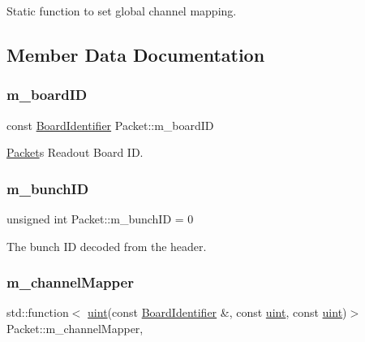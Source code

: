 Static function to set global channel mapping. 



\subsection{Member Data Documentation}
\mbox{\label{class_packet_a5e2c2ee20b510c10fc69d8045809a00e}} 
\subsubsection{\texorpdfstring{m\+\_\+board\+ID}{m\_boardID}}
{\footnotesize\ttfamily const \hyperlink{class_board_identifier}{Board\+Identifier} Packet\+::m\+\_\+board\+ID\hspace{0.3cm}{\ttfamily [private]}}



\hyperlink{class_packet}{Packet}\textquotesingle{}s Readout Board ID. 

\mbox{\label{class_packet_ad0a2dce379a45ee0f899d495f5e760fc}} 
\subsubsection{\texorpdfstring{m\+\_\+bunch\+ID}{m\_bunchID}}
{\footnotesize\ttfamily unsigned int Packet\+::m\+\_\+bunch\+ID = 0\hspace{0.3cm}{\ttfamily [private]}}



The bunch ID decoded from the header. 

\mbox{\label{class_packet_a33bf104c6d884aabd492de0e4eb5d293}} 
\subsubsection{\texorpdfstring{m\+\_\+channel\+Mapper}{m\_channelMapper}}
{\footnotesize\ttfamily std\+::function$<$ \hyperlink{_packet_8cpp_a69aa29b598b851b0640aa225a9e5d61d}{uint}(const \hyperlink{class_board_identifier}{Board\+Identifier} \&, const \hyperlink{_packet_8cpp_a69aa29b598b851b0640aa225a9e5d61d}{uint}, const \hyperlink{_packet_8cpp_a69aa29b598b851b0640aa225a9e5d61d}{uint})$>$ Packet\+::m\+\_\+channel\+Mapper\hspace{0.3cm}{\ttfamily [static]}, {\ttfamily [private]}}

